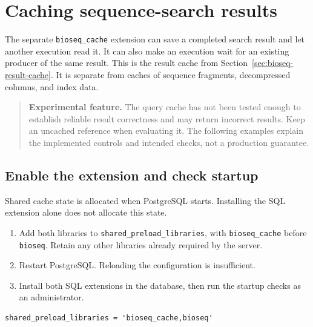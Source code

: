 \section{Caching sequence-search results}
\label{sec:appendix-query-cache}

The separate \texttt{bioseq\_cache} extension can save a completed search
result and let another execution read it. It can also make an execution wait
for an existing producer of the same result. This is the result cache from
Section~\ref{sec:bioseq-result-cache}. It is separate from caches of sequence
fragments, decompressed columns, and index data.

\begin{quote}
\textbf{Experimental feature.} The query cache has not been tested enough
to establish reliable result correctness and may return incorrect results.
Keep an uncached reference when evaluating it. The following examples explain
the implemented controls and intended checks, not a production guarantee.
\end{quote}

\subsection{Enable the extension and check startup}

Shared cache state is allocated when PostgreSQL starts. Installing the SQL
extension alone does not allocate this state.
\begin{enumerate}
  \item Add both libraries to \texttt{shared\_preload\_libraries}, with
    \texttt{bioseq\_cache} before \texttt{bioseq}. Retain any other libraries
    already required by the server.
  \item Restart PostgreSQL. Reloading the configuration is insufficient.
  \item Install both SQL extensions in the database, then run the startup
    checks as an administrator.
\end{enumerate}

\par\noindent\begin{minipage}{\linewidth}
\begin{lstlisting}[style=bioseq-appendix-text,
  caption={Server configuration: restart after changing this setting.}]
shared_preload_libraries = 'bioseq_cache,bioseq'
\end{lstlisting}
\end{minipage}

